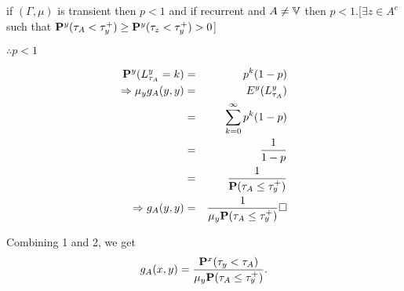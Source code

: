 \documentclass[main]{subfiles}
\begin{document}
if $(\Gamma, \mu)$ is transient then $p<1$ and if recurrent and $A \neq \V$ then $p<1$.[$\exists z \in A^c$ such that $\P^y(\tau_A < \tau_y^+) \geq \P^y(\tau_z < \tau_y^+)>0 $]

$\therefore p<1$

\begin{eqnarray*}
    \P^y(L_{\tau_A}^y=k) &=& p^k(1-p) \\
    \Rightarrow \mu_y g_A(y,y) &=& E^y(L_{\tau_A}^y) \\
    &=& \sum_{k=0}^{\infty} p^k(1-p) \\
    &=& \frac{1}{1-p} \\
    &=& \frac{1}{\P(\tau_A \leq \tau_y^+)} \\
    \Rightarrow g_A(y,y) &=& \frac{1}{\mu_y \P(\tau_A \leq \tau_y^+)} \square
\end{eqnarray*}

Combining 1 and 2, we get $$g_A(x,y)=\frac{\P^x(\tau_y< \tau_A)}{\mu_y \P(\tau_A \leq \tau_y^+)}.$$
\end{document}
